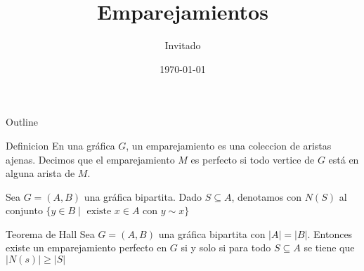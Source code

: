 \documentclass[presentation]{beamer}
\author{Invitado}
\date{\today}
\title{Emparejamientos}
\begin{document}
\maketitle
\begin{frame}{Outline}
\tableofcontents
\end{frame}


\begin{frame}[label={sec:org61e1c88}]{Definicion}
En una gráfica \(G\), un \alert{emparejamiento} es una coleccion de aristas ajenas.
Decimos que el emparejamiento \(M\) es \alert{perfecto} si todo
vertice de \(G\) está en alguna arista de \(M\).

Sea \(G=(A,B)\) una gráfica bipartita. Dado \(S\subseteq A\),
denotamos con \(N(S)\) al conjunto \(\{y\in B\mid\text{ existe }x\in
A\text{ con }y\sim x\}\)
\end{frame}

\begin{frame}[label={sec:org7f20916}]{Teorema de Hall}
Sea \(G=(A,B)\) una gráfica bipartita con \(|A|=|B|\). Entonces existe
un emparejamiento perfecto en \(G\) si y solo si para todo
\(S\subseteq A\) se tiene que \(|N(s)|\geq |S|\) 
\end{frame}
\end{document}
